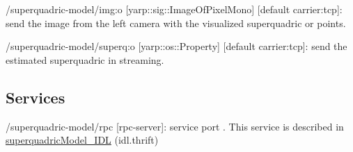 \begin{DoxyItemize}
\item /superquadric-\/model/img\+:o \mbox{[}yarp\+::sig\+::\+Image\+Of\+Pixel\+Mono\mbox{]} \mbox{[}default carrier\+:tcp\mbox{]}\+: send the image from the left camera with the visualized superquadric or points.
\item /superquadric-\/model/superq\+:o \mbox{[}yarp\+::os\+::\+Property\mbox{]} \mbox{[}default carrier\+:tcp\mbox{]}\+: send the estimated superquadric in streaming.
\end{DoxyItemize}\hypertarget{group__superquadric-model_services_sec}{}\subsection{Services}\label{group__superquadric-model_services_sec}

\begin{DoxyItemize}
\item /superquadric-\/model/rpc \mbox{[}rpc-\/server\mbox{]}\+: service port . This service is described in \mbox{\hyperlink{classsuperquadricModel__IDL}{superquadric\+Model\+\_\+\+I\+DL}} (idl.\+thrift) 
\end{DoxyItemize}